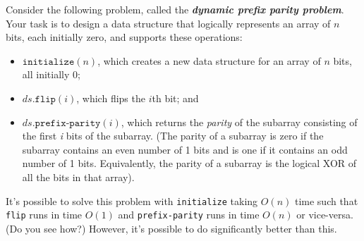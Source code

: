 \documentclass[12pt]{exam}
\newcommand*{\bigo}[1]{O\left( #1 \right)}
\begin{document}
\begin{questions}
Consider the following problem, called the \textbf{\emph{dynamic prefix parity problem}}. Your task is to design a data structure that logically represents an array of $n$ bits, each initially zero, and supports these operations:
\begin{itemize}
  \item $\texttt{initialize}(n)$, which creates a new data structure for an array of $n$ bits, all initially 0;
  \item $ds.\texttt{flip}(i)$, which flips the $i$th bit; and
  \item $ds.\texttt{prefix-parity}(i)$, which returns the \textit{parity} of the subarray consisting of the first \textit{i} bits of the subarray. (The parity of a subarray is zero if the subarray contains an even number of 1 bits and is one if it contains an odd number of 1 bits. Equivalently, the parity of a subarray is the logical XOR of all the bits in that array).
\end{itemize}

It's possible to solve this problem with \texttt{initialize} taking $\bigo{n}$ time such that \texttt{flip} runs in time $\bigo{1}$ and \texttt{prefix-parity} runs in time $\bigo{n}$ or vice-versa. (Do you see how?) However, it's possible to do significantly better than this.

\end{questions}
\end{document}
